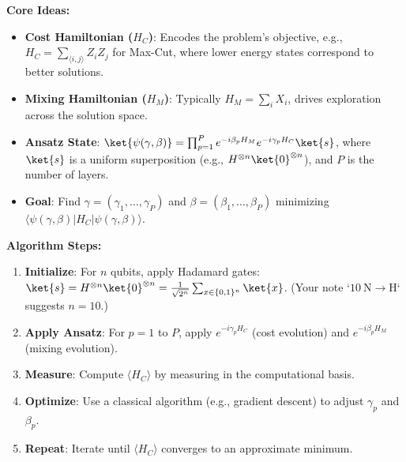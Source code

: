 \noindent
\textbf{Core Ideas:}
\begin{itemize}
  \item \textbf{Cost Hamiltonian ($H_C$)}: Encodes the problem’s objective,
    e.g., $H_C = \sum_{\langle i,j \rangle} Z_i Z_j$ for Max-Cut, where lower
    energy states correspond to better solutions.

  \item \textbf{Mixing Hamiltonian ($H_M$)}: Typically $H_M = \sum_i X_i$,
    drives exploration across the solution space.

  \item \textbf{Ansatz State}: $\ket{\psi(\gamma, \beta)} = \prod_{p=1}^P
    e^{-i\beta_p H_M} e^{-i\gamma_p H_C} \ket{s}$, where $\ket{s}$ is a
    uniform superposition (e.g., $H^{\otimes n} \ket{0}^{\otimes n}$), and
    $P$ is the number of layers.

  \item \textbf{Goal}: Find $\gamma = (\gamma_1, \ldots, \gamma_P)$ and
    $\beta = (\beta_1, \ldots, \beta_P)$ minimizing $\langle \psi(\gamma,
    \beta) | H_C | \psi(\gamma, \beta) \rangle$.

\end{itemize}

\vspace{0.3cm}


\vspace{0.3cm}

\noindent
\textbf{Algorithm Steps:}
\begin{enumerate}
  \item \textbf{Initialize}: For $n$ qubits, apply Hadamard gates: $\ket{s} =
    H^{\otimes n} \ket{0}^{\otimes n} = \frac{1}{\sqrt{2^n}} \sum_{x \in
    \{0,1\}^n} \ket{x}$. (Your note `$10 \mathrm{~N} \rightarrow \mathrm{H}$`
    suggests $n=10$.)

  \item \textbf{Apply Ansatz}: For $p=1$ to $P$, apply $e^{-i\gamma_p H_C}$
    (cost evolution) and $e^{-i\beta_p H_M}$ (mixing evolution).

  \item \textbf{Measure}: Compute $\langle H_C \rangle$ by measuring in the
    computational basis.

  \item \textbf{Optimize}: Use a classical algorithm (e.g., gradient descent)
    to adjust $\gamma_p$ and $\beta_p$.

  \item \textbf{Repeat}: Iterate until $\langle H_C \rangle$ converges to an
    approximate minimum.

\end{enumerate}

